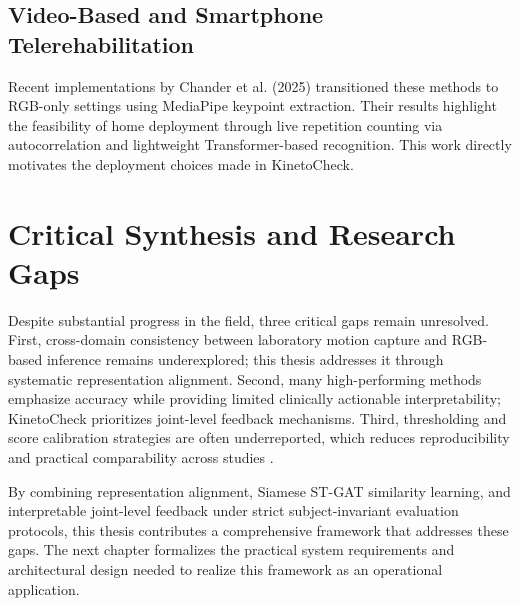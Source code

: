 \subsection{Video-Based and Smartphone Telerehabilitation}
\label{subsec:rw-video}

Recent implementations by Chander et al. (2025) \cite{CBS25} transitioned these methods to RGB-only settings using MediaPipe \cite{LTN+19} keypoint extraction. Their results highlight the feasibility of home deployment through live repetition counting via autocorrelation and lightweight Transformer-based recognition. This work directly motivates the deployment choices made in KinetoCheck.

\section{Critical Synthesis and Research Gaps}
\label{sec:research-gaps}

Despite substantial progress in the field, three critical gaps remain unresolved. First, cross-domain consistency between laboratory motion capture and RGB-based inference remains underexplored; this thesis addresses it through systematic representation alignment. Second, many high-performing methods emphasize accuracy while providing limited clinically actionable interpretability; KinetoCheck prioritizes joint-level feedback mechanisms. Third, thresholding and score calibration strategies are often underreported, which reduces reproducibility and practical comparability across studies \cite{ZGAA25,CXJS22}.

By combining representation alignment, Siamese ST-GAT similarity learning, and interpretable joint-level feedback under strict subject-invariant evaluation protocols, this thesis contributes a comprehensive framework that addresses these gaps. The next chapter formalizes the practical system requirements and architectural design needed to realize this framework as an operational application.